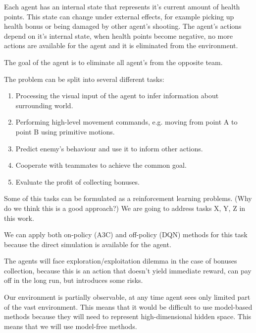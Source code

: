 Each agent has an internal state that represents it's current amount of health points. This state can change under external effects, for example picking up health bonus or being damaged by other agent's shooting.
The agent's actions depend on it's internal state, when health points become negative, no more actions are available for the agent and it is eliminated from the environment.

The goal of the agent is to eliminate all agent's from the opposite team.

The problem can be split into several different tasks:
\begin{enumerate}
    \item Processing the visual input of the agent to infer information about surrounding world.
    \item Performing high-level movement commands, e.g. moving from point A to point B using primitive motions.
    \item Predict enemy's behaviour and use it to inform other actions.
    \item Cooperate with teammates to achieve the common goal.
    \item Evaluate the profit of collecting bonuses.
\end{enumerate}

Some of this tasks can be formulated as a reinforcement learning problems.
(Why do we think this is a good approach?)
We are going to address tasks X, Y, Z in this work.



We can apply both on-policy (A3C) and off-policy (DQN) methods for this task because the direct simulation is available for the agent.

The agents will face exploration/exploitation dilemma in the case of bonuses collection, because this is an action that doesn't yield immediate reward, can pay off in the long run, but introduces some risks.

Our environment is partially observable, at any time agent sees only limited part of the vast environment. This means that it would be difficult to use model-based methods because they will need to represent high-dimensional hidden space. This means that we will use model-free methods.

